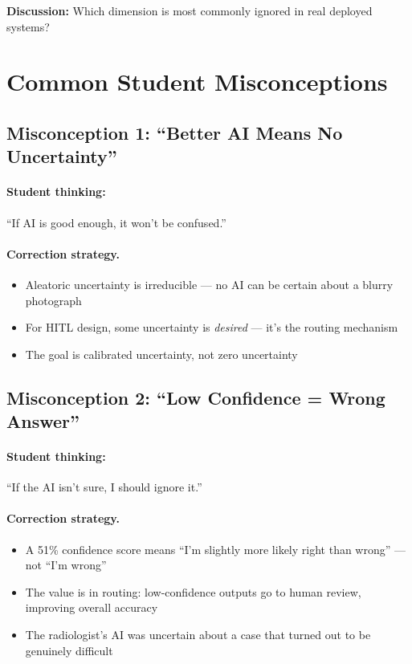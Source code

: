 \textbf{Discussion:} Which dimension is most commonly ignored in real deployed systems?

\section{Common Student Misconceptions}

\subsection{Misconception 1: ``Better AI Means No Uncertainty''}

\paragraph{Student thinking:} ``If AI is good enough, it won't be confused.''

\paragraph{Correction strategy.}
\begin{itemize}
    \item Aleatoric uncertainty is irreducible --- no AI can be certain about a blurry photograph
    \item For HITL design, some uncertainty is \emph{desired} --- it's the routing mechanism
    \item The goal is calibrated uncertainty, not zero uncertainty
\end{itemize}

\subsection{Misconception 2: ``Low Confidence = Wrong Answer''}

\paragraph{Student thinking:} ``If the AI isn't sure, I should ignore it.''

\paragraph{Correction strategy.}
\begin{itemize}
    \item A 51\% confidence score means ``I'm slightly more likely right than wrong'' --- not ``I'm wrong''
    \item The value is in routing: low-confidence outputs go to human review, improving overall accuracy
    \item The radiologist's AI was uncertain about a case that turned out to be genuinely difficult
\end{itemize}

